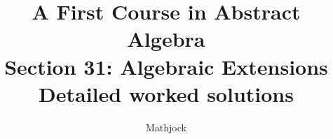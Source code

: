 
\title{\textbf{A First Course in Abstract Algebra}\\[0.3em]Section 31: Algebraic Extensions\\[0.3em]\large Detailed worked solutions}
\author{Mathjock}
\date{}

\maketitle
\bookinfo
\tableofcontents
\clearpage
\renewcommand{\thesection}{31}
\renewcommand{\theHsection}{fraleigh.31}


